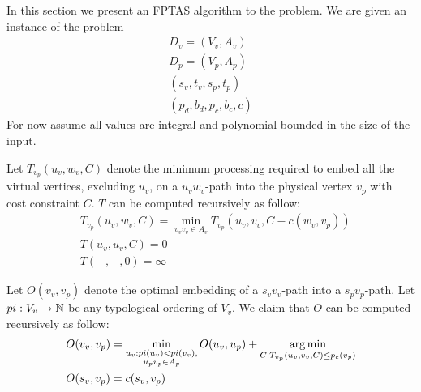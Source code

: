 In this section we present an FPTAS algorithm to the \VPN problem.
We are given an instance of the \VPN problem 
\begin{align*}
D_v = (V_v, A_v)		\\
D_p = (V_p, A_p)		\\
(s_v, t_v, s_p, t_p)	\\
(p_d, b_d, p_c, b_c, c)
\end{align*}
For now assume all values are integral and polynomial bounded in the size of the input.

Let $T_{v_p}(u_v, w_v, C)$ denote the minimum processing required to embed
all the virtual vertices, excluding $u_v$, on a $u_vw_v$-path into the physical
vertex $v_p$ with cost constraint $C$.
$T$ can be computed recursively as follow:
\begin{align*}
&T_{v_p}(u_v, w_v, C) = 
\min_{v_vv_v \in A_v} T_{v_p}(u_v, v_v, C - c(w_v, v_p))
\\
&T(u_v, u_v, C) = 0
\\
&T(-, -, 0) = \infty
\end{align*}
 
Let $O(v_v, v_p)$ denote the optimal embedding of a $s_vv_v$-path into a
$s_pv_p$-path.
Let $pi:V_v \to \mathbb{N}$ be any typological ordering of $V_v$. 
We claim that $O$ can be computed recursively as follow:
\begin{align*}
&O(v_v, v_p) = 
\min_{\substack{
u_v : pi(u_v) < pi(v_v), 
\\
u_pv_p \in A_p
}}
O(u_v, u_p)
+
\operatorname*{arg\,min}_{C : T_{v_p}(u_v, v_v, C) \leq p_c(v_p)}
\\
&O(s_v, v_p) = c(s_v, v_p)
\end{align*}


